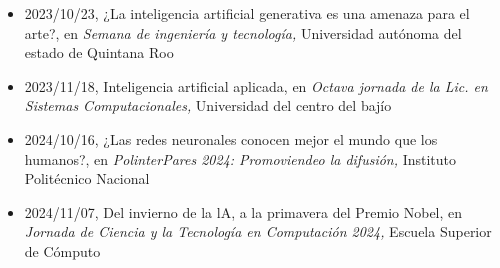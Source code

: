 \begin{itemize}
\item 2023/10/23, ¿La inteligencia artificial generativa es una amenaza para el arte?, en \textit{ Semana de ingeniería y tecnología,} Universidad autónoma del estado de Quintana Roo 
\item 2023/11/18, Inteligencia artificial aplicada, en \textit{ Octava jornada de la Lic. en Sistemas Computacionales,} Universidad del centro del bajío 
\item 2024/10/16, ¿Las redes neuronales conocen mejor el mundo que los humanos?, en \textit{ PolinterPares 2024: Promoviendeo la difusión,} Instituto Politécnico Nacional 
\item 2024/11/07, Del invierno de la lA, a la primavera del Premio Nobel, en \textit{ Jornada de Ciencia y la Tecnología en Computación 2024,} Escuela Superior de Cómputo 
\end{itemize} 
